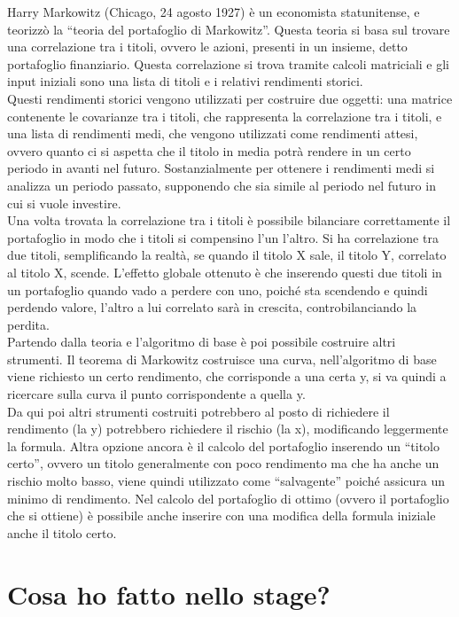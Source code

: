 Harry Markowitz (Chicago, 24 agosto 1927) è un economista statunitense, e teorizzò la “teoria del portafoglio di Markowitz”. Questa teoria si basa sul trovare una correlazione tra i titoli, ovvero le azioni, presenti in un insieme, detto portafoglio finanziario. Questa correlazione si trova tramite calcoli matriciali e gli input iniziali sono una lista di titoli e i relativi rendimenti storici.\\
Questi rendimenti storici vengono utilizzati per costruire due oggetti: una matrice contenente le covarianze tra i titoli, che rappresenta la correlazione tra i titoli, e una lista di rendimenti medi, che vengono utilizzati come rendimenti attesi, ovvero quanto ci si aspetta che il titolo in media potrà rendere in un certo periodo in avanti nel futuro. Sostanzialmente per ottenere i rendimenti medi si analizza un periodo passato, supponendo che sia simile al periodo nel futuro in cui si vuole investire. \\
Una volta trovata la correlazione tra i titoli è possibile bilanciare correttamente il portafoglio in modo che i titoli si compensino l’un l’altro. Si ha correlazione tra due titoli, semplificando la realtà, se quando il titolo X sale, il titolo Y, correlato al titolo X, scende. L’effetto globale ottenuto è che inserendo questi due titoli in un portafoglio quando vado a perdere con uno, poiché sta scendendo e quindi perdendo valore, l’altro a lui correlato sarà in crescita, controbilanciando la perdita.\\
Partendo dalla teoria e l’algoritmo di base è poi possibile costruire altri strumenti. Il teorema di Markowitz costruisce una curva, nell’algoritmo di base viene richiesto un certo rendimento, che corrisponde a una certa y, si va quindi a ricercare sulla curva il punto corrispondente a quella y.\\ 
Da qui poi altri strumenti costruiti potrebbero al posto di richiedere il rendimento (la y) potrebbero richiedere il rischio (la x), modificando leggermente la formula. Altra opzione ancora è il calcolo del portafoglio inserendo un “titolo certo”, ovvero un titolo generalmente con poco rendimento ma che ha anche un rischio molto basso, viene quindi utilizzato come “salvagente” poiché assicura un minimo di rendimento. Nel calcolo del portafoglio di ottimo (ovvero il portafoglio che si ottiene) è possibile anche inserire con una modifica della formula iniziale anche il titolo certo. 


\section{Cosa ho fatto nello stage?}

